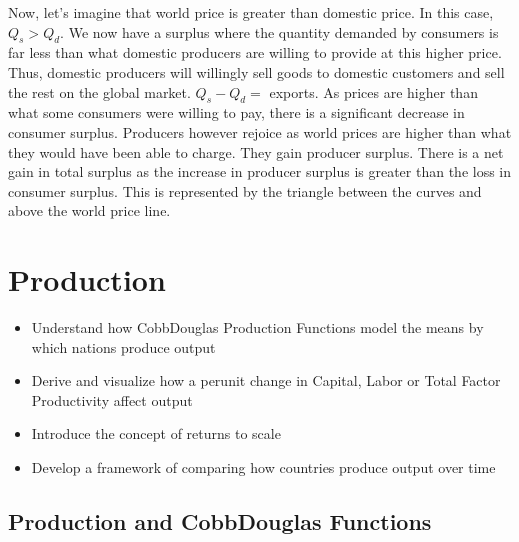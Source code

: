 \documentclass[letterpaper,10pt,english]{jupyterBook}
\begin{document}
\sphinxAtStartPar
Now, let’s imagine that world price is greater than domestic price. In this case, \(Q_s > Q_d\). We now have a surplus where the quantity demanded by consumers is far less than what domestic producers are willing to provide at this higher price. Thus, domestic producers will willingly sell goods to domestic customers and sell the rest on the global market. \(Q_s - Q_d =\) exports. As prices are higher than what some consumers were willing to pay, there is a significant decrease in consumer surplus. Producers however rejoice as world prices are higher than what they would have been able to charge. They gain producer surplus. There is a net gain in total surplus as the increase in producer surplus is greater than the loss in consumer surplus. This is represented by the triangle between the curves and above the world price line.


\section{Production}
\label{\detokenize{content/04-production/index:production}}\label{\detokenize{content/04-production/index::doc}}
\sphinxAtStartPar
{}
\begin{itemize}
\item {} 
\sphinxAtStartPar
Understand how Cobb\sphinxhyphen{}Douglas Production Functions model the means by which nations produce output

\item {} 
\sphinxAtStartPar
Derive and visualize how a per\sphinxhyphen{}unit change in Capital, Labor or Total Factor Productivity affect output

\item {} 
\sphinxAtStartPar
Introduce the concept of returns to scale

\item {} 
\sphinxAtStartPar
Develop a framework of comparing how countries produce output over time

\end{itemize}


\subsection{Production and Cobb\sphinxhyphen{}Douglas Functions}
\label{\detokenize{content/04-production/production:production-and-cobb-douglas-functions}}\label{\detokenize{content/04-production/production::doc}}
\end{document}
